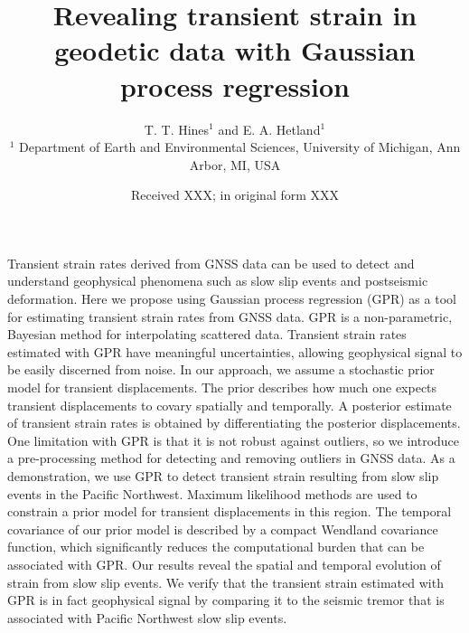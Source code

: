 \documentclass[extra,mreferee]{gji}
\title[Transient strain in geodetic data]
      {Revealing transient strain in geodetic data with Gaussian process regression}
\author[T. T. Hines and E. A. Hetland]
       {T. T. Hines$^1$ and E. A. Hetland$^1$ \\
        $^1$ Department of Earth and Environmental Sciences, University of Michigan, Ann Arbor, MI, USA}
\date{Received XXX; in original form XXX}
\begin{document}
\label{firstpage}

\maketitle

\newcommand{\pos}{\vec{x}} %
\newcommand{\data}{\mitbf{d}} %
\newcommand{\post}{\hat{u}} %
\newcommand{\points}{\mitbf{P}} %
\newcommand{\strain}{\dot\varepsilon} %
\newcommand{\E}[1]{\mathrm{E}\left[ #1 \right]} %
\newcommand{\Cov}[1]{\mathrm{Cov}\left[ #1 \right]} %
\newcommand{\e}{\mathrm{e}} %
\newcommand{\n}{\mathrm{n}} %
\newcommand{\G}{\mitbf{G}} %
\newcommand{\zeros}{\mitbf{0}} %
\newcommand{\eye}{\mitbf{I}} %

\begin{summary}

Transient strain rates derived from GNSS data can be used to detect
and understand geophysical phenomena such as slow slip events and
postseismic deformation. Here we propose using Gaussian process
regression (GPR) as a tool for estimating transient strain rates from
GNSS data. GPR is a non-parametric, Bayesian method for interpolating
scattered data. Transient strain rates estimated with GPR have
meaningful uncertainties, allowing geophysical signal to be easily
discerned from noise. In our approach, we assume a stochastic prior
model for transient displacements. The prior describes how much one
expects transient displacements to covary spatially and temporally. A
posterior estimate of transient strain rates is obtained by
differentiating the posterior displacements. One limitation with GPR
is that it is not robust against outliers, so we introduce a
pre-processing method for detecting and removing outliers in GNSS
data. As a demonstration, we use GPR to detect transient strain
resulting from slow slip events in the Pacific Northwest. Maximum
likelihood methods are used to constrain a prior model for transient
displacements in this region. The temporal covariance of our prior
model is described by a compact Wendland covariance function, which
significantly reduces the computational burden that can be associated
with GPR. Our results reveal the spatial and temporal evolution of
strain from slow slip events. We verify that the transient strain
estimated with GPR is in fact geophysical signal by comparing it to
the seismic tremor that is associated with Pacific Northwest slow slip
events.

\end{summary}
\end{document}
